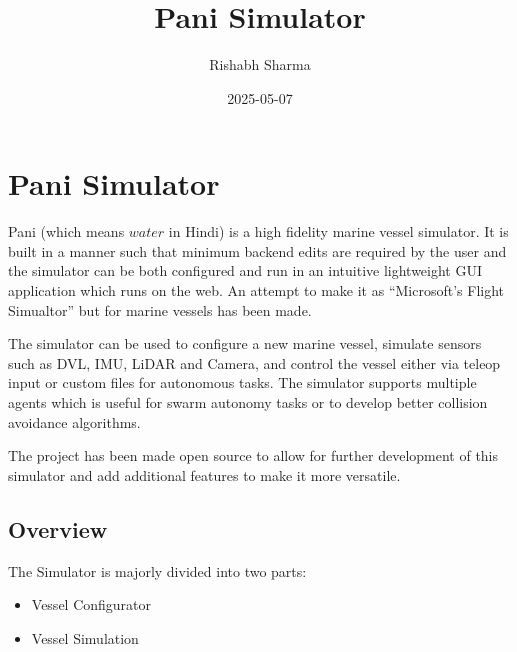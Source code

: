 \documentclass[
  letterpaper,
  DIV=11,
  numbers=noendperiod]{scrreprt}
\title{Pani Simulator}
\author{Rishabh Sharma}
\date{2025-05-07}
\providecommand{\tightlist}{%
  \setlength{\itemsep}{0pt}\setlength{\parskip}{0pt}}\usepackage{longtable,booktabs,array}
\renewcommand*\contentsname{Table of contents}
\newcommand\contentsname{Table of contents}
\begin{document}
\maketitle

\renewcommand*\contentsname{Table of contents}
{
\hypersetup{linkcolor=}
\setcounter{tocdepth}{2}
\tableofcontents
}


\chapter*{Pani Simulator}\label{pani-simulator}


Pani (which means \(\textit{water}\) in Hindi) is a high fidelity marine
vessel simulator. It is built in a manner such that minimum backend
edits are required by the user and the simulator can be both configured
and run in an intuitive lightweight GUI application which runs on the
web. An attempt to make it as ``Microsoft's Flight Simualtor'' but for
marine vessels has been made.

The simulator can be used to configure a new marine vessel, simulate
sensors such as DVL, IMU, LiDAR and Camera, and control the vessel
either via teleop input or custom files for autonomous tasks. The
simulator supports multiple agents which is useful for swarm autonomy
tasks or to develop better collision avoidance algorithms.

The project has been made open source to allow for further development
of this simulator and add additional features to make it more versatile.

\section*{Overview}\label{overview}


The Simulator is majorly divided into two parts:

\begin{itemize}
\tightlist
\item
  Vessel Configurator
\item
  Vessel Simulation
\end{itemize}
\end{document}
